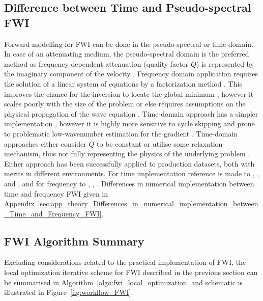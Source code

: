 \subsection{Difference between Time and Pseudo-spectral FWI}
Forward modelling for FWI can be done in the pseudo-spectral or time-domain. In case of an attenuating medium, the pseudo-spectral domain is the preferred method as frequency dependent attenuation (quality factor $Q$) is represented by the imaginary component of the velocity \citep{Pratt1999}. Frequency domain application requires the solution of a linear system of equations by a factorization method \citep{Sirgue2004}. This improves the chance for the inversion to locate the global minimum \citep{Sirgue2004}, however it scales poorly with the size of the problem \citep{Operto2007} or else requires assumptions on the physical propagation of the wave equation \citep{BenHadjAli2007}. Time-domain approach has a simpler implementation \citep{Vigh2008}, however it is highly more sensitive to cycle skipping \citep{Vigh2008} and prone to problematic low-wavenumber estimation for the gradient \citep{Sirgue2004}. Time-domain approaches either consider $Q$ to be constant or utilise some relaxation mechanism, thus not fully representing the physics of the underlying problem \citep{Blanch1995}. Either approach has been successfully applied to production datasets, both with merits in different environments. For time implementation reference is made to \cite{Vigh2008}, \cite{Vigh2010}, \cite{Liu2011} and \cite{Cai2015}, and for frequency to \cite{Ben-Hadj-Ali2008}, \cite{Operto2015}, \cite{Plessix2009}. Differences in numerical implementation between time and frequency FWI given in Appendix~\ref{sec:app_theory_Differences_in_numerical_implementation_between_Time_and_Frequency_FWI}.
\subsection{FWI Algorithm Summary}
Excluding considerations related to the practical implementation of FWI, the local optimization iterative scheme for FWI described in the previous section can be summarised in Algorithm~\ref{algo:fwi_local_optimization} and schematic is illustrated in Figure~\ref{fig:workflow_FWI}.

